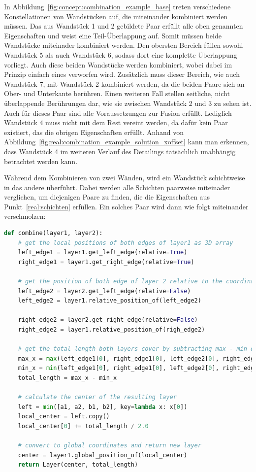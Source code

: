 In Abbildung~\ref{fig:concept:combination_example_base} treten verschiedene Konstellationen von Wandstücken auf, die miteinander kombiniert werden müssen.
Das aus Wandstück 1 und 2 gebildete Paar erfüllt alle oben genannten Eigenschaften und weist eine Teil-Überlappung auf.
Somit müssen beide Wandstücke miteinader kombiniert werden.
Den obersten Bereich füllen sowohl Wandstück 5 als auch Wandstück 6, sodass dort eine komplette Überlappung vorliegt.
Auch diese beiden Wandstücke werden kombiniert, wobei dabei im Prinzip einfach eines verworfen wird.
Zusätzlich muss dieser Bereich, wie auch Wandstück 7, mit Wandstück 2 kombiniert werden, da die beiden Paare sich an Ober- und Unterkante berühren.
Einen weiteren Fall stellen seitliche, nicht überlappende Berührungen dar, wie sie zwischen Wandstück 2 und 3 zu sehen ist.
Auch für dieses Paar sind alle Voraussetzungen zur Fusion erfüllt.
Lediglich Wandstück 4 muss nicht mit dem Rest vereint werden, da dafür kein Paar existiert, das die obrigen Eigenschaften erfüllt.
Anhand von Abbildung~\ref{fig:real:combination_example_solution_xoffset} kann man erkennen, dass Wandstück 4 im weiteren Verlauf des Detailings tatsächlich unabhängig betrachtet werden kann. 

Während dem Kombinieren von zwei Wänden, wird ein Wandstück schichtweise in das andere überführt.
Dabei werden alle Schichten paarweise miteinader verglichen, um diejenigen Paare zu finden, die die Eigenschaften aus Punkt~\ref{real:schichten} erfüllen.
Ein solches Paar wird dann wie folgt miteinander verschmolzen:

\begin{lstlisting}[language=Python, caption=Pseudocode zur Vereinigung zweier sich berührender oder überlappender Schichten von zwei nach den Voraussetzungen aus Abschnitt~\ref{concept:combination_properties} kombinierbaren Wandstücken.]
  def combine(layer1, layer2):
    # get the local positions of both edges of layer1 as 3D array
    left_edge1 = layer1.get_left_edge(relative=True)
    right_edge1 = layer1.get_right_edge(relative=True)

    # get the position of both edge of layer 2 relative to the coordinate systsem of layer1 as 3D array
    left_edge2 = layer2.get_left_edge(relative=False)
    left_edge2 = layer1.relative_position_of(left_edge2)

    right_edge2 = layer2.get_right_edge(relative=False)
    right_edge2 = layer1.relative_position_of(righ_edge2)

    # get the total length both layers cover by subtracting max - min of the x coordinates
    max_x = max(left_edge1[0], right_edge1[0], left_edge2[0], right_edge2[0]) 
    min_x = min(left_edge1[0], right_edge1[0], left_edge2[0], right_edge2[0]) 
    total_length = max_x - min_x

    # calculate the center of the resulting layer
    left = min([a1, a2, b1, b2], key=lambda x: x[0])
    local_center = left.copy()
    local_center[0] += total_length / 2.0

    # convert to global coordinates and return new layer
    center = layer1.global_position_of(local_center)
    return Layer(center, total_length)

\end{lstlisting}

